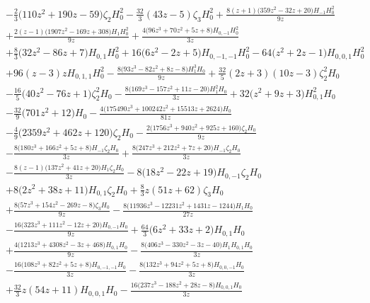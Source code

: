 \begin{eqnarray}
\nonumber \\ &&
-\frac{2}{3} \big(110 z^2+190 z-59\big) \zeta_2H_0^2-\frac{32}{3} (43 z-5) \zeta_3 H_0^2+\frac{8 (z+1) \big(359 z^2-32  z+20\big) H_{-1} H_0^2}{9 z}
\nonumber \\ &&
+\frac{2 (z-1) \big(1907 z^2-169 z+308\big) H_1  H_0^2}{9 z}+\frac{4 \big(96 z^3+70 z^2+5 z+8\big) H_{0,-1} H_0^2}{3  z}
\nonumber \\ &&
+\frac{8}{3} \big(32 z^2-86 z+7\big) H_{0,1} H_0^2+16 \big(6 z^2-2z+5\big) H_{0,-1,-1} H_0^2-64 \big(z^2+2 z-1\big) H_{0,0,1} H_0^2
\nonumber \\ &&
+96 (z-3) z H_{0,1,1} H_0^2-\frac{8 \big(93 z^3-82 z^2+8 z-8\big) H_1^3 H_0}{9  z}+\frac{32}{5} (2 z+3) (10 z-3) \zeta_2^2 H_0
\nonumber \\ &&
-\frac{16}{5} \big(40 z^2-76 z+1\big) \zeta_2^2 H_0-\frac{8 \big(169 z^3-157 z^2+11  z-20\big) H_1^2 H_0}{3 z}+32 \big(z^2+9 z+3\big) H_{0,1}^2 H_0
\nonumber \\ &&
-\frac{32}{9} \big(701 z^2+12\big) H_0-\frac{4 \big(175490 z^3+100242 z^2+15513  z+2624\big) H_0}{81 z}
\nonumber \\ &&
-\frac{4}{9}  \big(2359 z^2+462 z+120\big)\zeta_2 H_0-\frac{2 \big(1756 z^3+940 z^2+925 z+160\big) \zeta_2  H_0}{9 z}
\nonumber \\ &&
-\frac{8 \big(180 z^3+166 z^2+5 z+8\big) H_{-1} \zeta_2 H_0}{3  z}+\frac{8  \big(247 z^3+212 z^2+7 z+20\big) H_{-1} \zeta_2  H_0}{3 z}
\nonumber \\ &&
-\frac{8 (z-1) \big(137 z^2+41 z+20\big) H_1 \zeta_2 H_0}{3  z}-8  \big(18 z^2-22 z+19\big) H_{0,-1} \zeta_2 H_0
\nonumber \\ &&
+8 \big(2z^2+38 z+11\big) H_{0,1} \zeta_2 H_0+\frac{8}{3}  z (51 z+62)\zeta_3 H_0
\nonumber \\ &&
+\frac{8 \big(57 z^3+154 z^2-269 z-8\big) \zeta_3 H_0}{9  z}-\frac{8 \big(11936 z^3-12231 z^2+1431 z-1244\big) H_1 H_0}{27 z}
\nonumber \\ &&
-\frac{16  \big(323 z^3+111 z^2-12 z+20\big) H_{0,-1} H_0}{9 z}+\frac{64}{3} \big(6 z^2+33 z+2\big) H_{0,1} H_0
\nonumber \\ &&
+\frac{4 \big(1213 z^3+4308 z^2-3 z+468\big)  H_{0,1} H_0}{9 z}-\frac{8 \big(406 z^3-330 z^2-3 z-40\big) H_1 H_{0,1}  H_0}{3 z}
\nonumber \\ &&
-\frac{16 \big(108 z^3+82 z^2+5 z+8\big) H_{0,-1,-1} H_0}{3  z}-\frac{8 \big(132 z^3+94 z^2+5 z+8\big) H_{0,0,-1} H_0}{3 z}
\nonumber \\ &&
+\frac{32}{3} z (54 z+11) H_{0,0,1} H_0-\frac{16 \big(237 z^3-188 z^2+28 z-8\big)  H_{0,0,1} H_0}{3 z}

\end{eqnarray}
